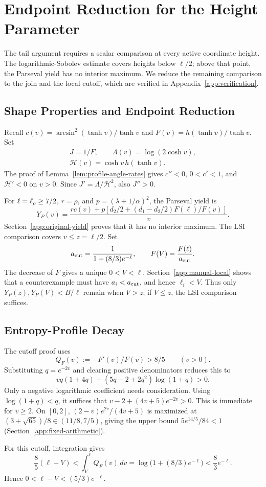 \section{Endpoint Reduction for the Height Parameter}
\label{app:endpoints}

The tail argument requires a scalar comparison at every active coordinate
height. The logarithmic-Sobolev estimate covers heights below \(\ell/2\);
above that point, the Parseval yield has no interior maximum. We reduce
the remaining comparison to the join and the local cutoff, which are
verified in Appendix~\ref{app:verification}.

\subsection{Shape Properties and Endpoint Reduction}

Recall \(c(v)=\arcsin^2(\tanh v)/\tanh v\) and
\(F(v)=h(\tanh v)/\tanh v\). Set
\begin{gather*}
 J=1/F,\qquad \Lambda(v)=\log(2\cosh v),\\
 {\mathcal H}(v)=\cosh v\,h(\tanh v).
\end{gather*}
The proof of Lemma~\ref{lem:profile-angle-rates} gives
\(c''<0\), \(0<c'<1\), and \({\mathcal H}'<0\) on \(v>0\).
Since \(J'=\Lambda/{\mathcal H}^2\), also \(J''>0\).

For \(\ell=\ell_\rho\ge7/2\), \(r=\rho\), and
\(p=(\lambda+1/\alpha)^2\), the Parseval yield is
\[
 Y_P(v)=\frac{r c(v)+p[d_2/2+(d_1-d_2/2)F(\ell)/F(v)]}{v}.
\]
Section~\ref{app:original-yield} proves that it has no interior
maximum. The LSI comparison covers \(v\le z=\ell/2\).
Set
\[
 a_{\rm cut}=\frac1{1+(8/3)e^{-\ell}},\qquad
 F(V)=\frac{F(\ell)}{a_{\rm cut}}.
\]
The decrease of \(F\) gives a unique \(0<V<\ell\).
Section~\ref{app:manual-local} shows that a counterexample must have
\(a_i<a_{\rm cut}\), and hence \(\ell_i<V\).
Thus only
\(Y_P(z),Y_P(V)<B/\ell\) remain when \(V>z\);
if \(V\le z\), the LSI comparison suffices.

\subsection{Entropy-Profile Decay}

The cutoff proof uses
\begin{equation}
 Q_F(v):=-F'(v)/F(v)>8/5\qquad(v>0).
 \label{eq:analytic-profile-speed}
\end{equation}
Substituting \(q=e^{-2v}\) and clearing positive denominators
reduces this to
\[
 vq(1+4q)+(5q-2+2q^2)\log(1+q)>0.
\]
Only a negative logarithmic coefficient needs consideration.
Using \(\log(1+q)<q\), it suffices that
\(v-2+(4v+5)e^{-2v}>0\). This is immediate for \(v\ge2\).
On \([0,2]\), \((2-v)e^{2v}/(4v+5)\) is maximized at
\((3+\sqrt{65})/8\in(11/8,7/5)\), giving the upper bound
\(5e^{14/5}/84<1\) (Section~\ref{app:fixed-arithmetic}).

For this cutoff, integration gives
\[
 \frac85(\ell-V)<\int_V^\ell Q_F(v)\,dv
 =\log\bigl(1+(8/3)e^{-\ell}\bigr)<\frac83e^{-\ell}.
\]
Hence \(0<\ell-V<(5/3)e^{-\ell}\).


